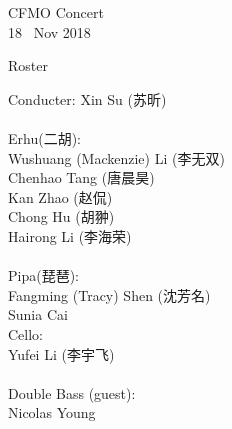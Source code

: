 \documentclass[letter,6pt,poets]{ConcProg}
\begin{document}
\begin{programme}{
    CFMO Concert
\\  {\normalsize 18 ~Nov 2018}
}
\begin{part}[]
  \end{part}
  
  
\end{programme}
\begin{center}
Roster
\end{center}

\begin{multicols}{2}%


Conducter: Xin Su (苏昕)
\\
\\
 Erhu(二胡):                 \\
Wushuang (Mackenzie) Li (李无双)   \\
Chenhao Tang  (唐晨昊) \\
Kan Zhao (赵侃)\\
Chong Hu (胡翀)\\
Hairong Li (李海荣)\\
\\
Pipa(琵琶):\\
Fangming (Tracy) Shen (沈芳名)\\
Sunia Cai\\
Cello:\\
Yufei Li (李宇飞)\\
\\
Double Bass (guest):\\
Nicolas Young\\
\\


\end{multicols}
\end{document}
